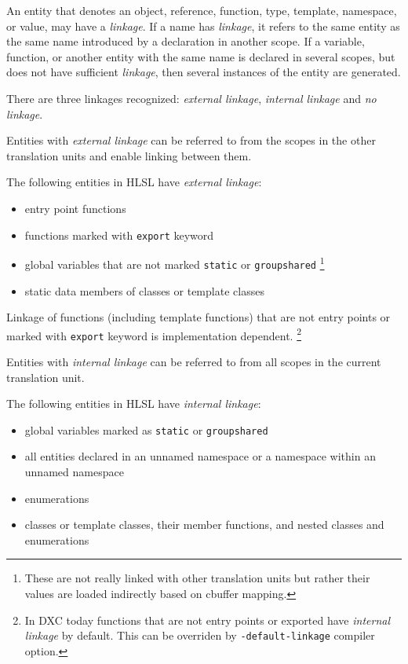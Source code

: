 
\p An entity that denotes an object, reference, function, type, template, namespace, or value, may have a \textit{linkage}. If a name has \textit{linkage}, it refers to the same entity as the same name introduced by a declaration in another scope. If a variable, function, or another entity with the same name is declared in several scopes, but does not have sufficient \textit{linkage}, then several instances of the entity are generated.

\p There are three linkages recognized: \textit{external linkage}, \textit{internal linkage} and \textit{no linkage}.


\p Entities with \textit{external linkage} can be referred to from the scopes in the other translation units and enable linking between them.

\p The following entities in HLSL have \textit{external linkage}:
\begin{itemize}
  \item entry point functions
  \item functions marked with \texttt{export} keyword
  \item global variables that are not marked \texttt{static} or \texttt{groupshared} \footnote{These are not really linked with other translation units but rather their values are loaded indirectly based on cbuffer mapping.}
  \item static data members of classes or template classes
\end{itemize}

\p Linkage of functions (including template functions) that are not entry points or marked with \texttt{export} keyword is implementation dependent. \footnote{In DXC today functions that are not entry points or exported have \textit{internal linkage} by default. This can be overriden by \texttt{-default-linkage} compiler option.}


\p Entities with \textit{internal linkage} can be referred to from all scopes in the current translation unit.

\p The following entities in HLSL have \textit{internal linkage}:
\begin{itemize}
  \item global variables marked as \texttt{static} or \texttt{groupshared}
  \item all entities declared in an unnamed namespace or a namespace within an unnamed namespace
  \item enumerations
  \item classes or template classes, their member functions, and nested classes and enumerations
\end{itemize}


